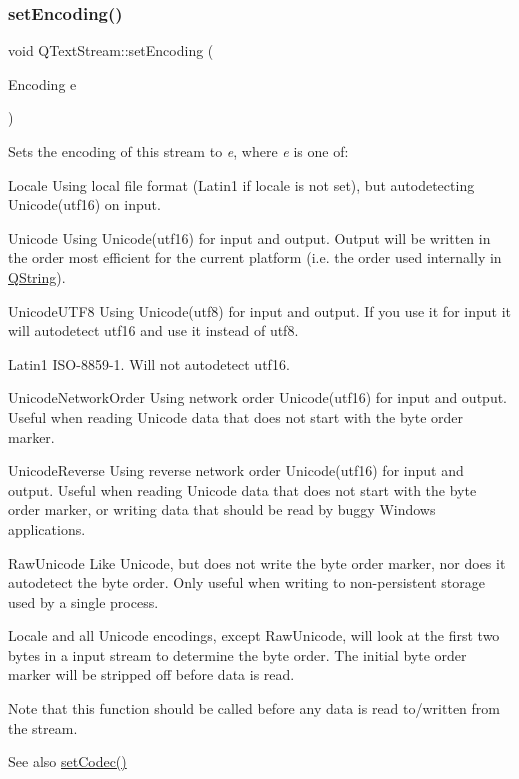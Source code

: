 \subsubsection{\texorpdfstring{setEncoding()}{setEncoding()}}
{\footnotesize\ttfamily void Q\+Text\+Stream\+::set\+Encoding (\begin{DoxyParamCaption}\item[{Encoding}]{e }\end{DoxyParamCaption})}

Sets the encoding of this stream to {\itshape e}, where {\itshape e} is one of\+: 
\begin{DoxyItemize}
\item {\ttfamily Locale} Using local file format (Latin1 if locale is not set), but autodetecting Unicode(utf16) on input. 
\item {\ttfamily Unicode} Using Unicode(utf16) for input and output. Output will be written in the order most efficient for the current platform (i.\+e. the order used internally in \mbox{\hyperlink{class_q_string}{Q\+String}}). 
\item {\ttfamily Unicode\+U\+T\+F8} Using Unicode(utf8) for input and output. If you use it for input it will autodetect utf16 and use it instead of utf8. 
\item {\ttfamily Latin1} I\+S\+O-\/8859-\/1. Will not autodetect utf16. 
\item {\ttfamily Unicode\+Network\+Order} Using network order Unicode(utf16) for input and output. Useful when reading Unicode data that does not start with the byte order marker. 
\item {\ttfamily Unicode\+Reverse} Using reverse network order Unicode(utf16) for input and output. Useful when reading Unicode data that does not start with the byte order marker, or writing data that should be read by buggy Windows applications. 
\item {\ttfamily Raw\+Unicode} Like Unicode, but does not write the byte order marker, nor does it autodetect the byte order. Only useful when writing to non-\/persistent storage used by a single process. 
\end{DoxyItemize}

{\ttfamily Locale} and all Unicode encodings, except {\ttfamily Raw\+Unicode}, will look at the first two bytes in a input stream to determine the byte order. The initial byte order marker will be stripped off before data is read.

Note that this function should be called before any data is read to/written from the stream. \begin{DoxySeeAlso}{See also}
\mbox{\hyperlink{class_q_text_stream_a18bdd4ae41cd9b37ec06827658fbf447}{set\+Codec()}} 
\end{DoxySeeAlso}
\mbox{\label{class_q_text_stream_adb71ee168e670b470bcbc547b994c5df}} 
